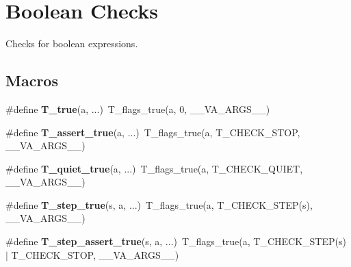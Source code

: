 \hypertarget{group__RTEMSTestFrameworkChecksBool}{}\section{Boolean Checks}
\label{group__RTEMSTestFrameworkChecksBool}


Checks for boolean expressions.  


\subsection*{Macros}
\begin{DoxyCompactItemize}
\item 
\mbox{\label{group__RTEMSTestFrameworkChecksBool_ga31c31da9b24d1b2eb2bfbc9a0f871172}} 
\#define {\bfseries T\+\_\+true}(a, ...)~T\+\_\+flags\+\_\+true(a, 0, \+\_\+\+\_\+\+V\+A\+\_\+\+A\+R\+G\+S\+\_\+\+\_\+)
\item 
\mbox{\label{group__RTEMSTestFrameworkChecksBool_ga9ca9f2a969dcb89e45675b24077ffd14}} 
\#define {\bfseries T\+\_\+assert\+\_\+true}(a, ...)~T\+\_\+flags\+\_\+true(a, T\+\_\+\+C\+H\+E\+C\+K\+\_\+\+S\+T\+OP, \+\_\+\+\_\+\+V\+A\+\_\+\+A\+R\+G\+S\+\_\+\+\_\+)
\item 
\mbox{\label{group__RTEMSTestFrameworkChecksBool_ga1bdbfc6b1ae3c10bc93aba3db019c80c}} 
\#define {\bfseries T\+\_\+quiet\+\_\+true}(a, ...)~T\+\_\+flags\+\_\+true(a, T\+\_\+\+C\+H\+E\+C\+K\+\_\+\+Q\+U\+I\+ET, \+\_\+\+\_\+\+V\+A\+\_\+\+A\+R\+G\+S\+\_\+\+\_\+)
\item 
\mbox{\label{group__RTEMSTestFrameworkChecksBool_ga1ac955677c1faad32d8725490862a7c4}} 
\#define {\bfseries T\+\_\+step\+\_\+true}(s,  a, ...)~T\+\_\+flags\+\_\+true(a, T\+\_\+\+C\+H\+E\+C\+K\+\_\+\+S\+T\+EP(s), \+\_\+\+\_\+\+V\+A\+\_\+\+A\+R\+G\+S\+\_\+\+\_\+)
\item 
\mbox{\label{group__RTEMSTestFrameworkChecksBool_gaf4aaac9906a413fb2cb6a09cabc8fcb7}} 
\#define {\bfseries T\+\_\+step\+\_\+assert\+\_\+true}(s,  a, ...)~T\+\_\+flags\+\_\+true(a, T\+\_\+\+C\+H\+E\+C\+K\+\_\+\+S\+T\+EP(s) $\vert$ T\+\_\+\+C\+H\+E\+C\+K\+\_\+\+S\+T\+OP, \+\_\+\+\_\+\+V\+A\+\_\+\+A\+R\+G\+S\+\_\+\+\_\+)

\end{DoxyCompactItemize}
